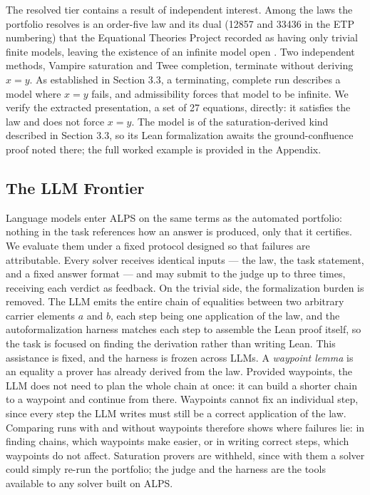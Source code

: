 \documentclass[letterpaper]{article} %
\begin{document}
The resolved tier contains a result of independent interest. Among the laws the portfolio resolves is an order-five law and its dual (12857 and 33436 in the ETP numbering) that the Equational Theories Project recorded as having only trivial finite models, leaving the existence of an infinite model open \citep{bolan2025equational}. Two independent methods, Vampire saturation and Twee completion, terminate without deriving $x = y$. As established in Section 3.3, a terminating, complete run describes a model where $x = y$ fails, and admissibility forces that model to be infinite. We verify the extracted presentation, a set of 27 equations, directly: it satisfies the law and does not force $x = y$. The model is of the saturation-derived kind described in Section 3.3, so its Lean formalization awaits the ground-confluence proof noted there; the full worked example is provided in the Appendix.






 
\subsection{The LLM Frontier}
 
Language models enter ALPS on the same terms as the automated portfolio: nothing in the task references how an answer is produced, only that it certifies. We evaluate them under a fixed protocol designed so that failures are attributable. Every solver receives identical inputs --- the law, the task statement, and a fixed answer format --- and may submit to the judge up to three times, receiving each verdict as feedback. On the trivial side, the formalization burden is removed. The LLM emits the entire chain of equalities between two arbitrary carrier elements $a$ and $b$, each step being one application of the law, and the autoformalization harness matches each step to assemble the Lean proof itself, so the task is focused on finding the derivation rather than writing Lean. This assistance is fixed, and the harness is frozen across LLMs. A \textit{waypoint lemma} is an equality a prover has already derived from the law. Provided waypoints, the LLM does not need to plan the whole chain at once: it can build a shorter chain to a waypoint and continue from there. Waypoints cannot fix an individual step, since every step the LLM writes must still be a correct application of the law. Comparing runs with and without waypoints therefore shows where failures lie: in finding chains, which waypoints make easier, or in writing correct steps, which waypoints do not affect. Saturation provers are withheld, since with them a solver could simply re-run the portfolio; the judge and the harness are the tools available to any solver built on ALPS.
\end{document}
